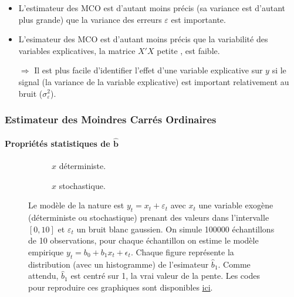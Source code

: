 \documentclass[10pt]{beamer}
\theoremstyle{plain}
\begin{document}
\begin{notes}
  \begin{itemize}
  \item L'estimateur des MCO est d'autant moins précis (sa variance est d'autant plus grande) que la variance des erreurs $\varepsilon$ est importante.\newline

  \item L'esimateur des MCO est d'autant moins précis que la variabilité des variables explicatives, la matrice $X'X$ \og petite \fg, est faible.\newline

  \item[$\Rightarrow$] Il est plus facile d'identifier l'effet d'une variable explicative sur $y$ si le signal (la variance de la variable explicative) est important relativement au bruit ($\sigma_{\varepsilon}^2$).
  \end{itemize}

\end{notes}


\begin{frame}
  \frametitle{Estimateur des Moindres Carrés Ordinaires}
  \framesubtitle {Propriétés statistiques de $\hat{\mathbf b}$}

  \begin{figure}
    \centering
    \begin{subfigure}{0.4\textwidth}
      \scalebox{.3}{
    }
    \caption{$x$ déterministe.}
    \label{fig:01:a}
  \end{subfigure}
  \hfill
  \begin{subfigure}{0.4\textwidth}
    \scalebox{.3}{
    }
    \caption{$x$ stochastique.}
    \label{fig:01:b}
  \end{subfigure}
  \label{fig:01}
  \caption{Le modèle de la nature est $y_t = x_t + \varepsilon_t$ avec $x_t$ une variable exogène (déterministe ou stochastique) prenant des valeurs dans l'intervalle $[0,10]$ et $\varepsilon_t$ un bruit blanc gaussien. On simule 100000  échantillons de 10 observations, pour chaque échantillon on estime le modèle empirique $y_t = b_0 + b_1 x_t + \epsilon_t$. Chaque figure représente la distribution (avec un histogramme) de l'esimateur $\hat b_1$. Comme attendu,  $\hat b_1$ est centré sur 1, la vrai valeur de la pente.  Les codes pour reproduire ces graphiques sont disponibles \href{https://mnemosyne.ithaca.fr/stephane/econometrics/src/commit/\HEAD/cours/codes/chapitre-1/estimator-with-deterministic-versus-stochastic-samples.py}{ici}.}
\end{figure}
\end{frame}
\end{document}
